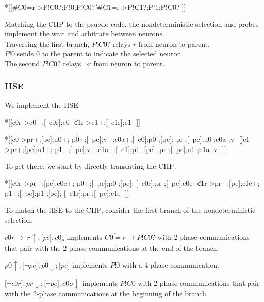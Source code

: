 \documentclass{article}
\begin{document}
\begin{csp}
*[[#{C0=r}->P!C0?;P!0;P!C0?
  \|#{C1=r}->P!C1?;P!1;P!C0?
 ]]
\end{csp}

\noindent
Matching the CHP to the psuedo-code, the nondeterministic selection and
probes implement the wait and arbitrate between neurons. \\
Traversing the first branch, $P!C0?$ relays $r$ from neuron to parent. \\
$P!0$ sends $0$ to the parent to indicate the selected neuron. \\
The second $P!C0?$ relays $\neg r$ from neuron to parent.

\subsubsection*{HSE}

We implement the HSE

\begin{hse}
*[[c0r->c0+;[~c0r];c0-
  \|c1r->c1+;[~c1r];c1-
 ]]

*[[c0->pr+;[pe];u0+;
    p0+;[~pe];v+;c0a+;[~c0];p0-;[pe];
    pr-;[~pe];u0-;c0a-,v-
  []c1->pr+;[pe];u1+;
    p1+;[~pe];v+;c1a+;[~c1];p1-;[pe];
    pr-;[~pe];u1-;c1a-,v-
 ]]
\end{hse}

\noindent
To get there, we start by directly translating the CHP:

\begin{hse}
*[[c0r->pr+;[pe];c0e+;
    p0+;[~pe];p0-;[pe];
    [~c0r];pr-;[~pe];c0e-
  \|c1r->pr+;[pe];c1e+;
    p1+;[~pe];p1-;[pe];
    [~c1r];pr-;[~pe];c1e-
 ]]
\end{hse}

\noindent
To match the HSE to the CHP, consider the first branch of the nondeterministic
selection:

$c0r\rightarrow\ r\uparrow;\texttt{[}pe\texttt{]};c0_o$ implements
$\overline{C0=r}\longrightarrow P!C0?$ with 2-phase communications that
pair with the 2-phase communications at the end of the branch.

$p0\uparrow;\texttt{[}\neg pe\texttt{]};p0\downarrow;\texttt{[}pe\texttt{]}$ implements $P!0$ with a 4-phase communication.

$\texttt{[}\neg c0r\texttt{]};pr\downarrow;\texttt{[}\neg pe\texttt{]};c0o\downarrow$ implements $P!C0$ with 2-phase communications that pair with the
2-phase communications at the beginning of the branch. \\
\end{document}
